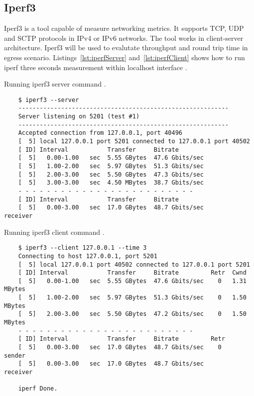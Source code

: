 \subsection{Iperf3}
\label{sec:iperf3}

Iperf3 is a tool capable of measure networking metrics. It supports TCP, UDP and SCTP protocols in IPv4 or IPv6 networks. The tool works in client-server architecture. Iperf3 will be used to evalutate throughput and round trip time in egress scenario. Listings~\ref{lst:iperfServer} and~\ref{lst:iperfClient} shows how to run iperf three seconds measurement within localhost interface \cite{Iperf}.

\begin{listing}[H]
    \centering
    \caption{Running iperf3 server command \cite{IperfDocs}.}
    \begin{verbatim}
    $ iperf3 --server
    -----------------------------------------------------------
    Server listening on 5201 (test #1)
    -----------------------------------------------------------
    Accepted connection from 127.0.0.1, port 40496
    [  5] local 127.0.0.1 port 5201 connected to 127.0.0.1 port 40502
    [ ID] Interval           Transfer     Bitrate
    [  5]   0.00-1.00   sec  5.55 GBytes  47.6 Gbits/sec                  
    [  5]   1.00-2.00   sec  5.97 GBytes  51.3 Gbits/sec                  
    [  5]   2.00-3.00   sec  5.50 GBytes  47.3 Gbits/sec                  
    [  5]   3.00-3.00   sec  4.50 MBytes  38.7 Gbits/sec                  
    - - - - - - - - - - - - - - - - - - - - - - - - -
    [ ID] Interval           Transfer     Bitrate
    [  5]   0.00-3.00   sec  17.0 GBytes  48.7 Gbits/sec                  receiver
    \end{verbatim}
    \label{lst:iperfServer}
\end{listing}

\begin{listing}[H]
    \centering
    \caption{Running iperf3 client command \cite{IperfDocs}.}
    \begin{verbatim}
    $ iperf3 --client 127.0.0.1 --time 3
    Connecting to host 127.0.0.1, port 5201
    [  5] local 127.0.0.1 port 40502 connected to 127.0.0.1 port 5201
    [ ID] Interval           Transfer     Bitrate         Retr  Cwnd
    [  5]   0.00-1.00   sec  5.55 GBytes  47.6 Gbits/sec    0   1.31 MBytes       
    [  5]   1.00-2.00   sec  5.97 GBytes  51.3 Gbits/sec    0   1.50 MBytes       
    [  5]   2.00-3.00   sec  5.50 GBytes  47.2 Gbits/sec    0   1.50 MBytes       
    - - - - - - - - - - - - - - - - - - - - - - - - -
    [ ID] Interval           Transfer     Bitrate         Retr
    [  5]   0.00-3.00   sec  17.0 GBytes  48.7 Gbits/sec    0             sender
    [  5]   0.00-3.00   sec  17.0 GBytes  48.7 Gbits/sec                  receiver

    iperf Done.
    \end{verbatim}
    \label{lst:iperfClient}
\end{listing}

